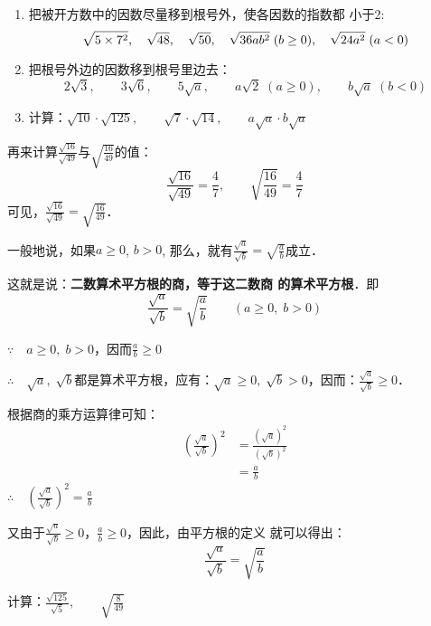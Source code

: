 \begin{ex}
\begin{enumerate}
    \item 把被开方数中的因数尽量移到根号外，使各因数的指数都
    小于2:
 \[   \sqrt{5\times7^2},\quad \sqrt{48},\quad \sqrt{50},\quad \sqrt{36ab^2}\; (b\ge 0),\quad  \sqrt{24a^2}\; (a<0)\]
    \item 把根号外边的因数移到根号里边去：
 \[   2\sqrt{3},\qquad 3\sqrt{6},\qquad 5\sqrt{a},\qquad a\sqrt{2}\;(a\ge 0),\qquad b\sqrt{a}\; (b<0)\]
    \item 计算：$\sqrt{10}\cdot \sqrt{125},\qquad \sqrt{7}\cdot \sqrt{14},\qquad a\sqrt{a}\cdot b\sqrt{a}$
\end{enumerate}
\end{ex}

再来计算$\frac{\sqrt{16}}{\sqrt{49}}$与$\sqrt{\frac{16}{49}}$的值：
\[\frac{\sqrt{16}}{\sqrt{49}}=\frac{4}{7},\qquad \sqrt{\frac{16}{49}}=\frac{4}{7}  \]
可见，$\frac{\sqrt{16}}{\sqrt{49}}=\sqrt{\frac{16}{49}}$．

一般地说，如果$a\ge 0$, $b>0$, 那么，就有$\frac{\sqrt{a}}{\sqrt{b}}=\sqrt{\frac{a}{b}}$成立．

这就是说：\textbf{二数算术平方根的商，等于这二数商
的算术平方根}．即
\[\frac{\sqrt{a}}{\sqrt{b}}=\sqrt{\frac{a}{b}}\qquad (a\ge 0,\; b>0)\]

\begin{note}
    $\because\quad a\ge 0, \; b>0$，因而$\frac{a}{b}\ge 0$

    $\therefore\quad \sqrt{a},\; \sqrt{b}$都是算术平方根，应有：$\sqrt{a}\ge 0,\; \sqrt{b}>0$，因而：$\frac{\sqrt{a}}{\sqrt{b}}\ge 0$．

    根据商的乘方运算律可知：
    \begin{align*}
\left(\frac{\sqrt{a}}{\sqrt{b}}\right)^2&=\frac{(\sqrt{a})^2}{(\sqrt{b})^2}\\
&=\frac{a}{b}\tag{算术平方根的性质}     
    \end{align*}
$\therefore\quad \left(\frac{\sqrt{a}}{\sqrt{b}}\right)^2=\frac{a}{b}$

又由于$\frac{\sqrt{a}}{\sqrt{b}}\ge 0$，$\frac{a}{b}\ge 0$，因此，由平方根的定义
就可以得出：
\[\frac{\sqrt{a}}{\sqrt{b}}=\sqrt{\frac{a}{b}}\]

\end{note}

\begin{example}
    计算：$\frac{\sqrt{125}}{\sqrt{5}},\qquad \sqrt{\frac{8}{49}}$
\end{example}



